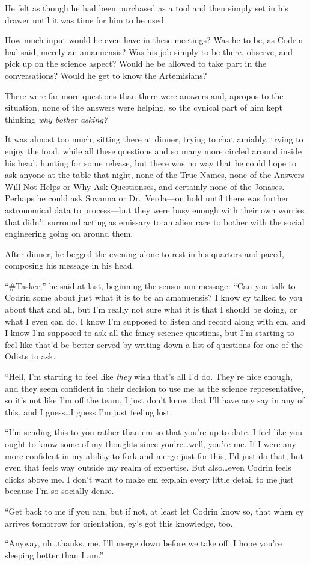 He felt as though he had been purchased as a tool and then simply set in his drawer until it was time for him to be used.

How much input would he even have in these meetings? Was he to be, as Codrin had said, merely an amanuensis? Was his job simply to be there, observe, and pick up on the science aspect? Would he be allowed to take part in the conversations? Would he get to know the Artemisians?

There were far more questions than there were answers and, apropos to the situation, none of the answers were helping, so the cynical part of him kept thinking \emph{why bother asking?}

It was almost too much, sitting there at dinner, trying to chat amiably, trying to enjoy the food, while all these questions and so many more circled around inside his head, hunting for some release, but there was no way that he could hope to ask anyone at the table that night, none of the True Names, none of the Answers Will Not Helps or Why Ask Questionses, and certainly none of the Jonases. Perhaps he could ask Sovanna or Dr.~Verda—on hold until there was further astronomical data to process—but they were busy enough with their own worries that didn't surround acting as emissary to an alien race to bother with the social engineering going on around them.

After dinner, he begged the evening alone to rest in his quarters and paced, composing his message in his head.

``\#Tasker,'' he said at last, beginning the sensorium message. ``Can you talk to Codrin some about just what it is to be an amanuensis? I know ey talked to you about that and all, but I'm really not sure what it is that I should be doing, or what I even can do. I know I'm supposed to listen and record along with em, and I know I'm supposed to ask all the fancy science questions, but I'm starting to feel like that'd be better served by writing down a list of questions for one of the Odists to ask.

``Hell, I'm starting to feel like \emph{they} wish that's all I'd do. They're nice enough, and they seem confident in their decision to use me as the science representative, so it's not like I'm off the team, I just don't know that I'll have any say in any of this, and I guess\ldots I guess I'm just feeling lost.

``I'm sending this to you rather than em so that you're up to date. I feel like you ought to know some of my thoughts since you're\ldots well, you're me. If I were any more confident in my ability to fork and merge just for this, I'd just do that, but even that feels way outside my realm of expertise. But also\ldots even Codrin feels clicks above me. I don't want to make em explain every little detail to me just because I'm so socially dense.

``Get back to me if you can, but if not, at least let Codrin know so, that when ey arrives tomorrow for orientation, ey's got this knowledge, too.

``Anyway, uh\ldots thanks, me. I'll merge down before we take off. I hope you're sleeping better than I am.''
